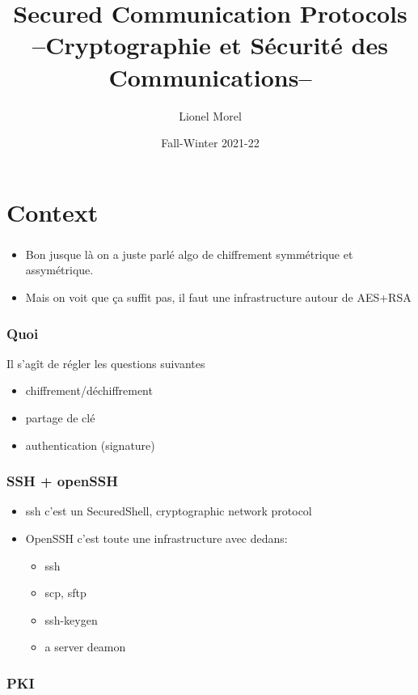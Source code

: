 \documentclass[
hyperref={pdfpagelabels=false}
,xcolor=table
]
{beamer}
\title[CSC - Intro]{Secured Communication Protocols \\ --Cryptographie et Sécurité des Communications--}
\author[]{Lionel Morel}
\institute[]{Telecommunications - INSA Lyon}
\date{Fall-Winter 2021-22}
\begin{document}
\begin{frame}
  \maketitle
\end{frame}

\section{Context}

\begin{frame}
  \frametitle{}
  \begin{itemize}
  \item Bon jusque là on a juste parlé algo de chiffrement symmétrique
    et assymétrique.
  \item Mais on voit que ça suffit pas, il faut une infrastructure autour de AES+RSA
  \end{itemize}
\end{frame}

\begin{frame}
  \frametitle{Quoi}
  Il s'agît de régler les questions suivantes
  \begin{itemize}
  \item chiffrement/déchiffrement
  \item partage de clé
  \item authentication (signature)
  \end{itemize}
\end{frame}

\begin{frame}
  \frametitle{SSH + openSSH}

  \begin{itemize}
  \item ssh c'est un SecuredShell, cryptographic network protocol
  
  \item OpenSSH c'est toute une infrastructure avec dedans: 
    \begin{itemize}
    \item ssh
    \item scp, sftp
    \item ssh-keygen
    \item a server deamon
  \end{itemize}
  \end{itemize}
\end{frame}



\begin{frame}
  \frametitle{PKI}
\end{frame}
\end{document}

